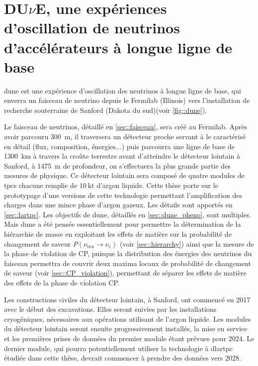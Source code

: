     \section{\texorpdfstring{DU$\nu$E}{DUNE}, une expériences d'oscillation de neutrinos d'accélérateurs à longue ligne de base}
    
        \gls{dune} est une expérience d'oscillation des neutrinos à longue ligne de base, qui enverra un faisceau de neutrino depuis le Fermilab (Illinois) vers l'installation de recherche souterraine de Sanford (Dakota du sud)(voir \autoref{fig::dune}). 
        
        Le faisceau de neutrinos, détaillé en \autoref{sec::faisceau}, sera créé au Fermilab. Après avoir parcouru \SI{300}{\meter}, il traversera un détecteur proche servant à le caractérisé en détail (flux, composition, énergies...) puis parcourra une ligne de base de \SI{1300}{\kilo\meter} à travers la croûte terrestre avant d'atteindre le détecteur lointain à Sanford, à \SI{1475}{\meter} de profondeur, on s'effectuera la plus grande partie des mesures de physique. Ce détecteur lointain sera composé de quatre modules de \glspl{tpc} chacune remplie de $\SI{10}{\kilo\tonne}$ d'argon liquide. Cette thèse porte sur le prototypage d'une versions de cette technologie permettant l'amplification des charges dans une mince phase d'argon gazeux. Les détails sont apportés en \autoref{sec::lartpc}. Les objectifs de \gls{dune}, détaillés en \autoref{sec::dune_pheno}, sont multiples. Mais \gls{dune} a été pensée essentiellement pour permettre la détermination de la hiérarchie de masse en exploitant les effets de matière sur la probabilité de changement de saveur $P(\nu_{mu} \to \nu_e)$ (voir \autoref{sec::hierarchy}) ainsi que la mesure de la phase de violation de CP, puisque la distribution des énergies des neutrinos du faisceau permettra de couvrir deux maxima locaux de probabilité de changement de saveur (voir \autoref{sec::CP_violation}), permettant de séparer les effets de matière des effets de la phase de violation CP. 
        
        Les constructions civiles du détecteur lointain, à Sanford, ont commencé en 2017 avec le début des excavations. Elles seront suivies par les installations cryogéniques, nécessaires aux opérations utilisant de l'argon liquide. Les modules du détecteur lointain seront ensuite progressivement installés, la mise en service et les premières prises de données du premier module étant prévues pour 2024\cite{Acciarri2016}. Le dernier module, qui pourra potentiellement utiliser la technologie à \gls{dlartpc} étudiée dans cette thèse, devrait commencer à prendre des données vers 2028.
        
